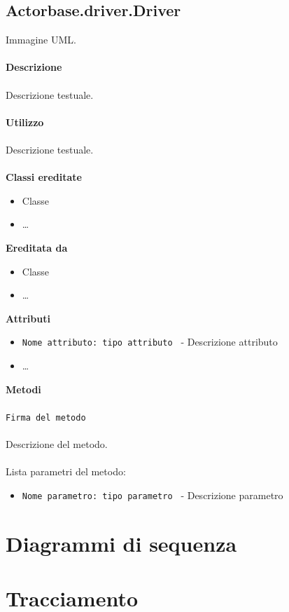 \documentclass[a4paper]{article}
\begin{document}
	\subsection{Actorbase.driver.Driver}	
		Immagine UML.
		\\ \\
		\textbf{Descrizione}
			\\ \\
			Descrizione testuale.
			\\ \\
		\textbf{Utilizzo}
			\\ \\
			Descrizione testuale.
			\\ \\
		\textbf{Classi ereditate}
			\begin{itemize}
				\item Classe
				\item \dots
			\end{itemize}
		\textbf{Ereditata da}
			\begin{itemize}
				\item Classe
				\item \dots
			\end{itemize}
		\textbf{Attributi}
			\begin{itemize}
				\item \texttt{Nome attributo: tipo attributo } - Descrizione attributo
				\item \dots
			\end{itemize}
		\textbf{Metodi}
			\\ \\
			\texttt{Firma del metodo}
			\\ \\
			Descrizione del metodo.
			\\ \\
			Lista parametri del metodo:
			\begin{itemize}
				\item \texttt{Nome parametro: tipo parametro } - Descrizione parametro
			\end{itemize}
			
	\newpage
	
	\section{Diagrammi di sequenza}
	
	\newpage
	
	\section{Tracciamento}
	
\end{document}
